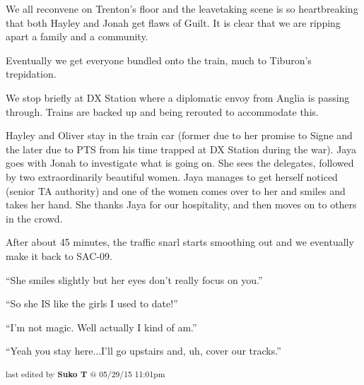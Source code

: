 We all reconvene on Trenton's floor and the leavetaking scene is so heartbreaking that both Hayley and Jonah get flaws of Guilt. It is clear that we are ripping apart a family and a community.



Eventually we get everyone bundled onto the train, much to Tiburon's trepidation.



We stop briefly at DX Station where a diplomatic envoy from Anglia is passing through.  Trains are backed up and being rerouted to accommodate this.



Hayley and Oliver stay in the train car (former due to her promise to Signe and the later due to PTS from his time trapped at DX Station during the war).  Jaya goes with Jonah to investigate what is going on.  She sees the delegates, followed by two extraordinarily beautiful women.  Jaya manages to get herself noticed (senior TA authority) and one of the women comes over to her and smiles and takes her hand.  She thanks Jaya for our hospitality, and then moves on to others in the crowd.



After about 45 minutes, the traffic snarl starts smoothing out and we eventually make it back to SAC-09.



``She smiles slightly but her eyes don't really focus on you.''

``So she IS like the girls I used to date!''




``I'm not magic.  Well actually I kind of am.''




``Yeah you stay here...I'll go upstairs and, uh, cover our tracks.''



\vspace{\fill}

\begin{flushright}
\textsubscript{last edited by \textbf{Suko T} @ 05/29/15 11:01pm}
\end{flushright}
